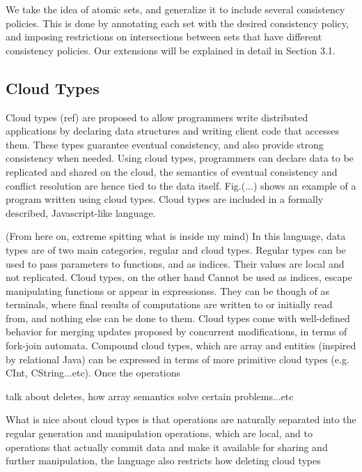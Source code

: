 We take the idea of atomic sets, and generalize it to include several
consistency policies. This is done by annotating each set with the desired
consistency policy, and imposing restrictions on intersections between sets that
have different consistency policies. Our extensions will be explained in detail in Section 3.1.

\subsection{Cloud Types}
Cloud types (ref) are proposed to allow programmers write distributed applications by
declaring data structures and writing client code that accesses them.
These types guarantee eventual consistency, and also provide strong consistency
when needed. Using cloud types, programmers can declare data to be replicated
and shared on the cloud, the semantics of eventual consistency and conflict
resolution are hence tied to the data itself. Fig.(...) shows an example of a
program written using cloud types. Cloud types are included in a formally
described, Javascript-like language.

(From here on, extreme spitting what is inside my mind)
In this language, data types are of two main categories, regular and cloud
types. Regular types can be used to pass parameters to functions, and as
indices. Their values are local and not replicated. Cloud types, on the other
hand Cannot be used as indices, escape manipulating functions or appear in
expressionss. They can be though of as terminals, where final results of
computations are written to or initially read from, and nothing else can be done
to them. Cloud types come with well-defined behavior for merging updates
proposed by concurrent modifications, in terms of fork-join automata. Compound
cloud types, which are array and entities (inspired by relational Java) can be
expressed in terms of more primitive cloud types (e.g. CInt, CString...etc).
Once the operations

talk about deletes, how array semantics solve certain problems...etc

What is nice about cloud types is that operations are naturally separated into
the regular generation and manipulation operations, which are local, and to
operations that actually commit data and make it available for sharing and
further manipulation, the language also restricts how deleting cloud types


